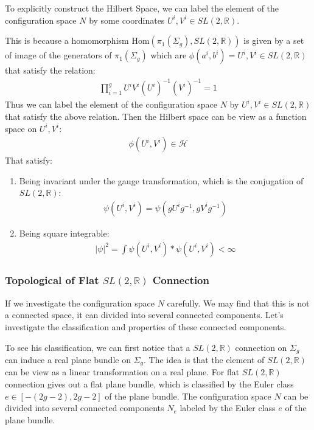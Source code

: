 To explicitly construct the Hilbert Space, we can label the element
of the configuration space $ N $ by some coordinates $ U^i,V^i \in
SL(2,\mathbb{R}) $.

This is because a homomorphism $ \mathrm{Hom}(\pi_1(\Sigma_g),
SL(2,\mathbb{R})) $ is given by a set of image of the generators of $
\pi_1(\Sigma_g) $ which are  $ \phi(a^i,b^i) = U^i,V^i \in
SL(2,\mathbb{R}) $ that satisfy the relation:
\begin{align}
  \prod_{i=1}^g U^i V^i (U^i)^{-1} (V^i)^{-1} = 1
\end{align}
Thus we can label the element of the configuration space $ N $ by $
U^i,V^i \in SL(2,\mathbb{R}) $ that satisfy the above relation. Then
the Hilbert space can be view as a function space on $ U^i,V^i $:
\begin{align}
  \phi(U^i,V^i) \in \mathcal{H}
\end{align}
That satisfy:
\begin{enumerate}
  \item Being invariant under the gauge transformation, which is the
    conjugation of
    $ SL(2,\mathbb{R}) $:
    \begin{align}
      \psi(U^i,V^i) = \psi(g U^i g^{-1}, g V^i g^{-1})
    \end{align}
  \item Being square integrable:
    \begin{align}
      |\psi|^2 = \int \psi(U^i,V^i) * \psi(U^i, V^i)  < \infty
    \end{align}
\end{enumerate}

\subsubsection{Topological of Flat $ SL(2,\mathbb{R}) $
Connection}\label{sec:Topologicalsl2r}

If we investigate the configuration space $ N $ carefully. We may
find that this is not a connected space, it can divided into several
connected components. Let's investigate the classification and
properties of these connected components.

To see his classification, we can first notice that a $
SL(2,\mathbb{R}) $ connection on $ \Sigma_g $ can induce a real plane
bundle on $ \Sigma_g $. The idea is that the element of $
SL(2,\mathbb{R}) $ can be view as a linear transformation on a real plane.
For flat $ SL(2,\mathbb{R}) $ connection gives out a flat plane
bundle, which is classified by the Euler class $ e \in [-(2g-2),
2g-2] $ of the plane bundle. The configuration space $ N $ can be
divided into several connected components $ N_e $ labeled by the
Euler class $ e $ of the plane bundle.

